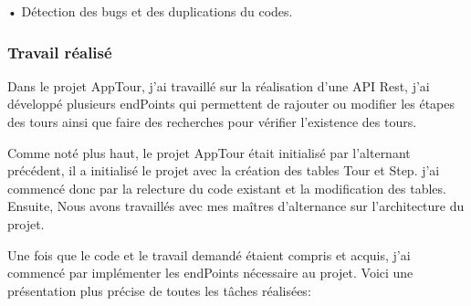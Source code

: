 \documentclass[12pt]{article}
\begin{document}
• Détection des bugs et des duplications du codes.
 
\subsubsection{Travail réalisé}

Dans le projet AppTour, j'ai travaillé sur la réalisation d'une API Rest, j'ai développé plusieurs endPoints qui permettent de rajouter ou modifier les étapes des tours ainsi que faire des recherches pour vérifier l’existence des tours. 

Comme noté plus haut, le projet AppTour était initialisé par l'alternant précédent, il a initialisé le projet avec la création des tables Tour et Step. j'ai commencé donc par la relecture du code existant et la modification des tables. Ensuite, Nous avons travaillés avec mes maîtres d'alternance sur l'architecture du projet.

Une fois que le code et le travail demandé étaient compris et acquis, j'ai commencé par implémenter les endPoints nécessaire au projet. Voici une présentation plus précise de toutes les tâches réalisées:   
\end{document}
